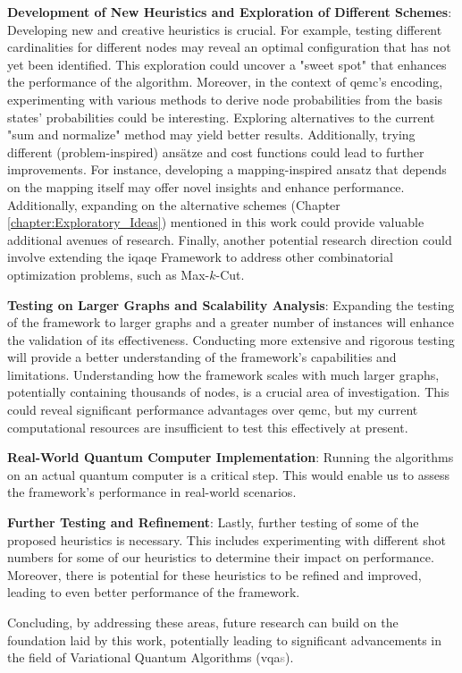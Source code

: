 \noindent\textbf{Development of New Heuristics and Exploration of Different Schemes}: Developing new and creative heuristics is crucial. For example, testing different cardinalities for different nodes may reveal an optimal configuration that has not yet been identified. This exploration could uncover a "sweet spot" that enhances the performance of the algorithm. Moreover, in the context of \acrshort{qemc}'s encoding, experimenting with various methods to derive node probabilities from the basis states' probabilities could be interesting. Exploring alternatives to the current "sum and normalize" method may yield better results. Additionally, trying different (problem-inspired) ansätze and cost functions could lead to further improvements. For instance, developing a mapping-inspired ansatz that depends on the mapping itself may offer novel insights and enhance performance. Additionally, expanding on the alternative schemes (Chapter \ref{chapter:Exploratory_Ideas}) mentioned in this work could provide valuable additional avenues of research. Finally, another potential research direction could involve extending the \acrshort{iqaqe} Framework to address other combinatorial optimization problems, such as Max-\(k\)-Cut.
\vspace{5mm}

\noindent\textbf{Testing on Larger Graphs and Scalability Analysis}: Expanding the testing of the framework to larger graphs and a greater number of instances will enhance the validation of its effectiveness. Conducting more extensive and rigorous testing will provide a better understanding of the framework's capabilities and limitations. Understanding how the framework scales with much larger graphs, potentially containing thousands of nodes, is a crucial area of investigation. This could reveal significant performance advantages over \acrshort{qemc}, but my current computational resources are insufficient to test this effectively at present.
\vspace{5mm}

\noindent\textbf{Real-World Quantum Computer Implementation}: Running the algorithms on an actual quantum computer is a critical step. This would enable us to assess the framework's performance in real-world scenarios.
\vspace{5mm}

\noindent\textbf{Further Testing and Refinement}: Lastly, further testing of some of the proposed heuristics is necessary. This includes experimenting with different shot numbers for some of our heuristics to determine their impact on performance. Moreover, there is potential for these heuristics to be refined and improved, leading to even better performance of the framework.
\vspace{5mm}

Concluding, by addressing these areas, future research can build on the foundation laid by this work, potentially leading to significant advancements in the field of Variational Quantum Algorithms (\acrshort{vqa}\textcolor{gray}{s}).


